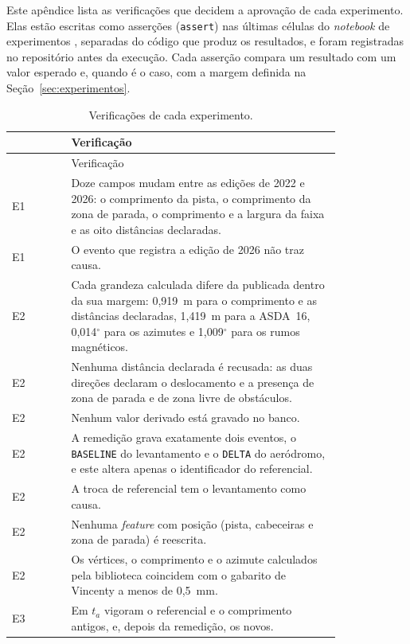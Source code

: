 Este apêndice lista as verificações que decidem a aprovação de cada experimento. Elas estão escritas como asserções (\texttt{assert}) nas últimas células do \textit{notebook} de experimentos \cite{aeroledger_experimentos}, separadas do código que produz os resultados, e foram registradas no repositório antes da execução. Cada asserção compara um resultado com um valor esperado e, quando é o caso, com a margem definida na Seção~\ref{sec:experimentos}.

\begin{longtable}{l p{0.82\linewidth}}
    \caption{Verificações de cada experimento.}\label{tab:ape-testes}\\
    \toprule
    & Verificação \\
    \midrule
    \endfirsthead
    \toprule
    & Verificação \\
    \midrule
    \endhead
    \bottomrule
    \endfoot
    E1 & Doze campos mudam entre as edições de 2022 e 2026: o comprimento da pista, o comprimento da zona de parada, o comprimento e a largura da faixa e as oito distâncias declaradas. \\
    E1 & O evento que registra a edição de 2026 não traz causa. \\
    \midrule
    E2 & Cada grandeza calculada difere da publicada dentro da sua margem: 0,919~m para o comprimento e as distâncias declaradas, 1,419~m para a ASDA~16, 0,014$^\circ$ para os azimutes e 1,009$^\circ$ para os rumos magnéticos. \\
    E2 & Nenhuma distância declarada é recusada: as duas direções declaram o deslocamento e a presença de zona de parada e de zona livre de obstáculos. \\
    E2 & Nenhum valor derivado está gravado no banco. \\
    E2 & A remedição grava exatamente dois eventos, o \texttt{BASELINE} do levantamento e o \texttt{DELTA} do aeródromo, e este altera apenas o identificador do referencial. \\
    E2 & A troca de referencial tem o levantamento como causa. \\
    E2 & Nenhuma \textit{feature} com posição (pista, cabeceiras e zona de parada) é reescrita. \\
    E2 & Os vértices, o comprimento e o azimute calculados pela biblioteca coincidem com o gabarito de Vincenty a menos de 0,5~mm. \\
    \midrule
    E3 & Em $t_a$ vigoram o referencial e o comprimento antigos, e, depois da remedição, os novos. \\

\end{longtable}
